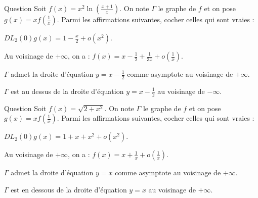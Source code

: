 \begin{multi}[multiple,feedback=
{D'abord, \(\displaystyle g(x)=\frac{\ln (1+x)}{x}=1-\frac{x}{2}+\frac{x^2}{3}+o(x^2)\). Donc, au voisinage de \(\pm\infty\), on a :
\[f(x)=x-\frac{1}{2}+\frac{1}{3x}+o\left(\frac{1}{x}\right)\mbox{ car }f(x)=xg\left(\frac{1}{x}\right).\]
La droite d'équation \(\displaystyle y=x-\frac{1}{2}\) est une asymptote au voisinage de \(\pm\infty\). De plus, au voisinage de \(-\infty\), \(\displaystyle f(x)-y=\frac{1}{3x}+o\left(\frac{1}{x}\right)\leq 0\). Donc \(\Gamma\) est en dessous de cette droite au voisinage de \(-\infty\).
}]{Question}
Soit \(\displaystyle f(x)=x^2\ln \left(\frac{x+1}{x}\right)\). On note \(\Gamma\) le graphe de \(f\) et on pose \(\displaystyle g(x)=xf\left(\frac{1}{x}\right)\). Parmi les affirmations suivantes, cocher celles qui sont vraies :

    \item \(\displaystyle DL_2(0)g(x)=1-\frac{x}{2}+o(x^2)\).
    \item* Au voisinage de \(+\infty\), on a : \(\displaystyle f(x)=x-\frac{1}{2}+\frac{1}{3x}+o\left(\frac{1}{x}\right)\).
    \item* \(\Gamma\) admet la droite d'équation \(\displaystyle y=x-\frac{1}{2}\) comme asymptote au voisinage de \(+\infty\).
    \item \(\Gamma\) est au dessus de la droite d'équation \(\displaystyle y=x-\frac{1}{2}\) au voisinage de \(-\infty\).
\end{multi}


\begin{multi}[multiple,feedback=
{D'abord, au voisinage de \(0^+\), on a : \(g(x)=\sqrt{1+2x^2}=1+x^2+o(x^2)\) et donc, au voisinage de \(+\infty\), on a :
\[f(x)=x+\frac{1}{x}+o\left(\frac{1}{x}\right)\mbox{ car }f(x)=xg\left(\frac{1}{x}\right).\]
La droite d'équation \(y=x\) est une asymptote au voisinage de \(+\infty\). De plus, au voisinage de \(+\infty\), \(\displaystyle f(x)-y=\frac{1}{x}+o\left(\frac{1}{x}\right)\geq 0\). Donc \(\Gamma\) est au dessus de la droite d'équation \(y=x\) au voisinage de \(+\infty\).
}]{Question}
Soit \(\displaystyle f(x)=\sqrt{2+x^2}\). On note \(\Gamma\) le graphe de \(f\) et on pose \(\displaystyle g(x)=xf\left(\frac{1}{x}\right)\). Parmi les affirmations suivantes, cocher celles qui sont vraies :

    \item \(\displaystyle DL_2(0)g(x)=1+x+x^2+o(x^2)\).
    \item* Au voisinage de \(+\infty\), on a : \(\displaystyle f(x)=x+\frac{1}{x}+o\left(\frac{1}{x}\right)\).
    \item* \(\Gamma\) admet la droite d'équation \(y=x\) comme asymptote au voisinage de \(+\infty\).
    \item \(\Gamma\) est en dessous de la droite d'équation \(y=x\) au voisinage de \(+\infty\).
\end{multi}



